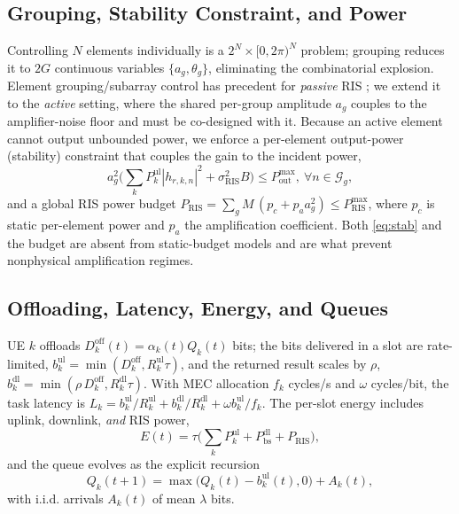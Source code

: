 \documentclass[conference]{IEEEtran}
\begin{document}
\subsection{Grouping, Stability Constraint, and Power}
Controlling $N$ elements individually is a $2^N\times[0,2\pi)^N$ problem; grouping
reduces it to $2G$ continuous variables $\{a_g,\theta_g\}$, eliminating the
combinatorial explosion. Element grouping/subarray control has precedent for
\emph{passive} RIS \cite{yang2021grouping,wu2019iros}; we extend it to the
\emph{active} setting, where the shared per-group amplitude $a_g$ couples to the
amplifier-noise floor and must be co-designed with it. Because an active element cannot output unbounded power, we
enforce a per-element output-power (stability) constraint that couples the gain to
the incident power,
\begin{equation}
a_g^2\Big(\sum_{k}P_k^{\mathrm{ul}}|h_{r,k,n}|^2+\sigma_{\mathrm{RIS}}^2 B\Big)\le P_{\mathrm{out}}^{\max},\ \forall n\in\mathcal{G}_g,
\label{eq:stab}
\end{equation}
and a global RIS power budget
$P_{\mathrm{RIS}}=\sum_g M\,(p_c+p_a a_g^2)\le P_{\mathrm{RIS}}^{\max}$,
where $p_c$ is static per-element power and $p_a$ the amplification coefficient.
Both \eqref{eq:stab} and the budget are absent from static-budget models and are
what prevent nonphysical amplification regimes.

\subsection{Offloading, Latency, Energy, and Queues}
UE $k$ offloads $D_k^{\mathrm{off}}(t)=\alpha_k(t)Q_k(t)$ bits; the bits delivered
in a slot are rate-limited, $b_k^{\mathrm{ul}}=\min(D_k^{\mathrm{off}},R_k^{\mathrm{ul}}\tau)$,
and the returned result scales by $\rho$, $b_k^{\mathrm{dl}}=\min(\rho\,D_k^{\mathrm{off}},R_k^{\mathrm{dl}}\tau)$.
With MEC allocation $f_k$ cycles/s and $\omega$ cycles/bit, the task latency is
$L_k=b_k^{\mathrm{ul}}/R_k^{\mathrm{ul}}+b_k^{\mathrm{dl}}/R_k^{\mathrm{dl}}+\omega b_k^{\mathrm{ul}}/f_k$.
The per-slot energy includes uplink, downlink, \emph{and} RIS power,
\begin{equation}
E(t)=\tau\Big(\textstyle\sum_k P_k^{\mathrm{ul}}+P_{\mathrm{bs}}^{\mathrm{dl}}+P_{\mathrm{RIS}}\Big),
\label{eq:energy}
\end{equation}
and the queue evolves as the explicit recursion
\begin{equation}
Q_k(t{+}1)=\max\!\big(Q_k(t)-b_k^{\mathrm{ul}}(t),0\big)+A_k(t),
\label{eq:queue}
\end{equation}
with i.i.d. arrivals $A_k(t)$ of mean $\lambda$ bits.
\end{document}
